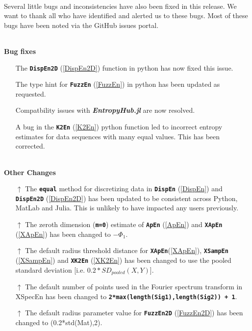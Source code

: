 \documentclass[12pt, a4paper, titlepage, openany]{book}
\begin{document}
\ \\Several little bugs and inconsistencies have also been fixed in this release. We want to thank all who have identified and alerted us to these bugs. Most of these bugs have been noted via the GitHub issues portal.

\ \\ \textbf{Bug fixes}
\begin{itemize}
\item[\checkmark] The \texttt{\textbf{DispEn2D}} (\ref{DispEn2D}) function in python has now fixed this issue.
\item[\checkmark] The type hint for \texttt{\textbf{FuzzEn}} (\ref{FuzzEn}) in python has been updated as requested.
\item[\checkmark] Compatbility issues with \textit{\textbf{EntropyHub.jl}} are now resolved.
\item[\checkmark] A bug in the \texttt{\textbf{K2En}} (\ref{K2En}) python function led to incorrect entropy estimates for data sequences with many equal values. This has been corrected.
\end{itemize}

\ \\ \textbf{Other Changes}
\begin{itemize}
\item[\textbf{$\uparrow$}] The \texttt{\textbf{equal}} method for discretizing data in \texttt{\textbf{DispEn}} (\ref{DispEn}) and \texttt{\textbf{DispEn2D}} (\ref{DispEn2D}) has been updated to be consistent across Python, MatLab and Julia.
This is unlikely to have impacted any users previously.
\item[\textbf{$\uparrow$}] The zeroth dimension (\texttt{\textbf{m=0}}) estimate of \texttt{\textbf{ApEn}} (\ref{ApEn}) and \texttt{\textbf{XApEn}} (\ref{XApEn}) has been changed to $-\Phi_1$.
\item[\textbf{$\uparrow$}] The default radius threshold distance for \texttt{\textbf{XApEn}}(\ref{XApEn}), \texttt{\textbf{XSampEn}} (\ref{XSampEn}) and \texttt{\textbf{XK2En}} (\ref{XK2En}) has been changed to use the pooled standard deviation [i.e. $0.2*SD_{pooled}(X,Y)$].
\item[\textbf{$\uparrow$}] The default number of points used in the Fourier spectrum transform in XSpecEn has been changed to \textbf{\texttt{2*max(length(Sig1),length(Sig2)) + 1}}.
\item[\textbf{$\uparrow$}] The default radius parameter value for \texttt{\textbf{FuzzEn2D}} (\ref{FuzzEn2D}) has been changed to (0.2*std(Mat),2).
\end{itemize}
\end{document}
